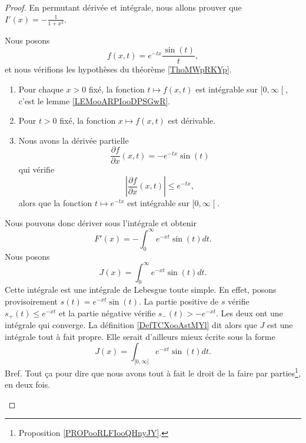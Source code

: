 \begin{proof}
	En permutant dérivée et intégrale, nous allons prouver que \( I'(x)=-\frac{1}{ 1+x^2 }\).

	\begin{subproof}
		\spitem[Permuter]
		Nous posons
		\begin{equation}
			f(x,t)= e^{-tx}\frac{ \sin(t) }{ t },
		\end{equation}
		et nous vérifions les hypothèses du théorème \ref{ThoMWpRKYp}.

		\begin{enumerate}
			\item
			      Pour chaque \( x>0\) fixé, la fonction \( t\mapsto f(x,t)\) est intégrable sur \( \mathopen[ 0 , \infty \mathclose[\), c'est le lemme \ref{LEMooARPIooDPSGwR}.
			\item
			      Pour \( t>0\) fixé, la fonction \( x\mapsto f(x,t)\) est dérivable.
			\item
			      Nous avons la dérivée partielle
			      \begin{equation}
				      \frac{ \partial f }{ \partial x }(x,t)=- e^{-tx}\sin(t)
			      \end{equation}
			      qui vérifie
			      \begin{equation}
				      | \frac{ \partial f }{ \partial x }(x,t) |\leq  e^{-tx},
			      \end{equation}
			      alors que la fonction \( t\mapsto  e^{-tx}\) est intégrable sur \( \mathopen[ 0 , \infty \mathclose[\).
		\end{enumerate}
		Nous pouvons donc dériver sous l'intégrale et obtenir
		\begin{equation}
			F'(x)=-\int_0^{\infty} e^{-xt}\sin(t)dt.
		\end{equation}
		Nous posons
		\begin{equation}
			J(x)=\int_0^{\infty} e^{-xt}\sin(t)dt.
		\end{equation}
		Cette intégrale est une intégrale de Lebesgue toute simple. En effet, posons provisoirement \( s(t)= e^{-xt}\sin(t)\). La partie positive de \( s\) vérifie \( s_+(t)\leq  e^{-xt}\) et la partie négative vérifie \( s_-(t)> -e^{-xt}\). Les deux ont une intégrale qui converge. La définition \ref{DefTCXooAstMYl} dit alors que \( J\) est une intégrale tout à fait propre. Elle serait d'ailleurs mieux écrite sous la forme
		\begin{equation}
			J(x)=\int_{\mathopen[ 0 , \infty \mathclose]} e^{-xt}\sin(t)dt.
		\end{equation}
		Bref. Tout ça pour dire que nous avons tout à fait le droit de la faire par parties\footnote{Proposition \ref{PROPooRLFIooQHnyJY}.}, en deux fois.


\end{subproof}
\end{proof}
